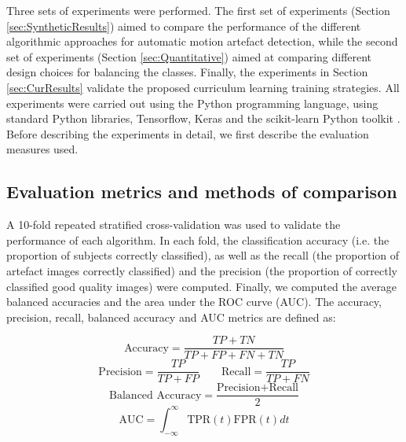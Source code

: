 \documentclass[preprint,12pt,authoryear]{elsarticle}
\begin{document}
Three sets of experiments were performed. The first set of experiments (Section \ref{sec:SyntheticResults}) aimed to compare the performance of the different algorithmic approaches for automatic motion artefact detection, while the second set of experiments (Section \ref{sec:Quantitative}) aimed at comparing different design choices for balancing the classes. Finally, the experiments in Section \ref{sec:CurResults} validate the proposed curriculum learning training strategies.
All experiments were carried out using the Python programming language, using standard Python libraries, Tensorflow, Keras and the scikit-learn Python toolkit \citep{Pedregosa2011}.
Before describing the experiments in detail, we first describe the evaluation measures used.\\


\subsection{Evaluation metrics and methods of comparison}
\label{sec:error_measures}
A 10-fold repeated stratified cross-validation was used to validate the performance of each algorithm. In each fold, the classification accuracy (i.e. the proportion of subjects correctly classified), as well as the recall (the proportion of artefact images correctly classified) and the precision (the proportion of correctly classified good quality images) were computed. Finally, we computed the average balanced accuracies and the area under the ROC curve (AUC).
The accuracy, precision, recall, balanced accuracy and AUC metrics are defined as:

$$\text{Accuracy}= \dfrac{TP+TN}{TP+FP+FN+TN}$$
$$\text{Precision}= \dfrac{TP}{TP+FP} \quad  \quad  \text{Recall}= \dfrac{TP}{TP+FN}$$
$$\text{Balanced Accuracy}= \dfrac{\text{Precision+Recall}}{2}$$
$$\text{AUC}= \int_{-\infty }^{\infty } \text{TPR}(t) \text{FPR}(t) dt$$ \\
\end{document}
